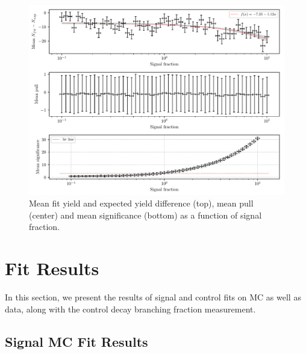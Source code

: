 \begin{figure}[H]
	\centering
	\captionsetup{width=0.8\linewidth}
	\includegraphics[width=\linewidth]{fig/lin_test}
	\caption{Mean fit yield and expected yield difference (top), mean pull (center) and mean significance (bottom) as a function of signal fraction.}
	\label{fig:lin_test}
\end{figure}


\chapter{Fit Results}
\label{sec:fit-results}
In this section, we present the results of signal and control fits on MC as well as data, along with the control decay branching fraction measurement.

\section{Signal MC Fit Results}\label{sec:signal-mc-fit-results}

